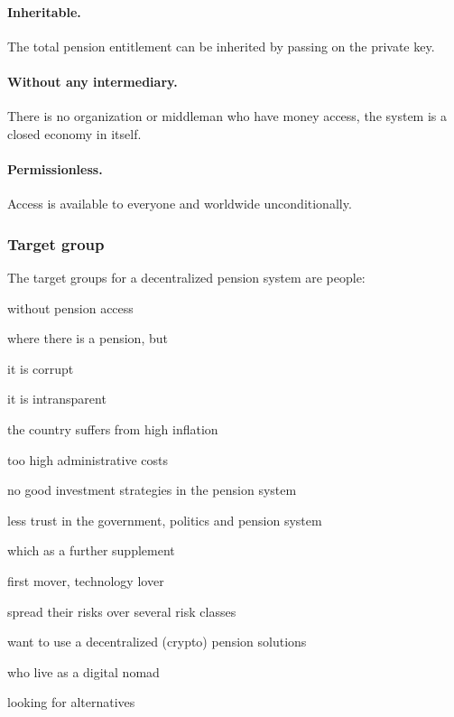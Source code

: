 \paragraph{Inheritable.} The total pension entitlement can be inherited by passing on the private key.

\paragraph{Without any intermediary.} There is no organization or middleman who have money access, the system is a closed economy in itself.

\paragraph{Permissionless.} 
Access is available to everyone and worldwide unconditionally.



\subsubsection{Target group}
The target groups for a decentralized pension system are people:

\begin{compactitem}
\item without pension access
\item where there is a pension, but
 \begin{compactitem}
 \item it is corrupt
 \item it is intransparent
 \item the country suffers from high inflation
 \item too high administrative costs
 \item no good investment strategies in the pension system
 \item less trust in the government, politics and pension system
 \end{compactitem}
\item which as a further supplement 
 \begin{compactitem}
 \item first mover, technology lover
 \item spread their risks over several risk classes
 \item want to use a decentralized (crypto) pension solutions
 \item who live as a digital nomad
 \item looking for alternatives
 \end{compactitem}
\end{compactitem}

